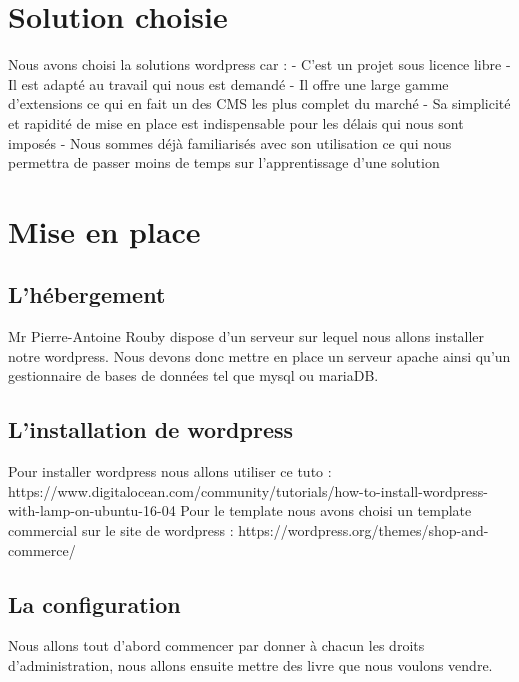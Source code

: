\documentclass[a4paper,12pt]{report}
\begin{document}
\chapter{Solution choisie}

Nous avons choisi la solutions wordpress car : - C'est un projet sous
licence libre - Il est adapté au travail qui nous est demandé - Il
offre une large gamme d’extensions ce qui en fait un des CMS les plus
complet du marché - Sa simplicité et rapidité de mise en place est
indispensable pour les délais qui nous sont imposés - Nous sommes déjà
familiarisés avec son utilisation ce qui nous permettra de passer
moins de temps sur l'apprentissage d'une solution

\chapter{Mise en place}
\section{L'hébergement}

Mr Pierre-Antoine Rouby dispose d'un serveur sur lequel nous allons
installer notre wordpress. Nous devons donc mettre en place un serveur
apache ainsi qu'un gestionnaire de bases de données tel que mysql ou
mariaDB.

\section{L'installation de wordpress}

Pour installer wordpress nous allons utiliser ce tuto :
https://www.digitalocean.com/community/tutorials/how-to-install-wordpress-with-lamp-on-ubuntu-16-04
Pour le template nous avons choisi un template commercial sur le site
de wordpress : https://wordpress.org/themes/shop-and-commerce/

\section{La configuration}

Nous allons tout d'abord commencer par donner à chacun les droits
d'administration, nous allons ensuite mettre des livre que nous
voulons vendre.
\end{document}

